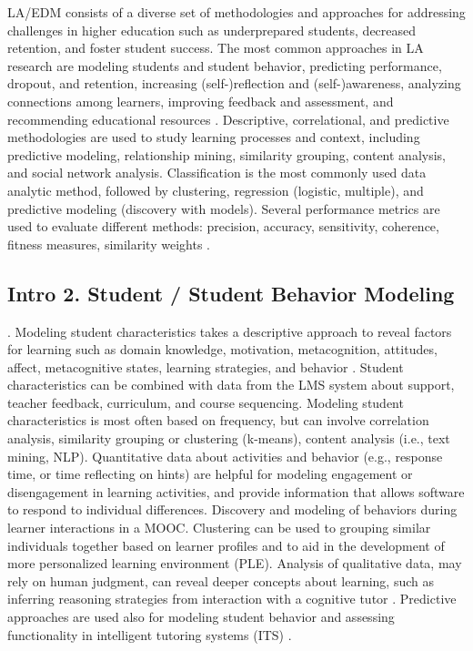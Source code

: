 \documentclass[sigconf]{acmart}
\begin{document}

LA/EDM consists of a diverse set of methodologies and approaches for 
addressing challenges in higher education such as underprepared students, 
decreased retention, and foster student success. The most common approaches in 
LA research are modeling students and student behavior, predicting performance, 
dropout, and retention, increasing (self-)reflection and (self-)awareness, 
analyzing connections among learners, improving feedback and assessment, and 
recommending educational resources \cite{lang17, lester19, papamitsiou14}. 
Descriptive, correlational, and predictive methodologies are used to study 
learning processes and context, including predictive modeling, relationship 
mining, similarity grouping, content analysis, and social network analysis. 
Classification is the most commonly used data analytic method, followed by 
clustering, regression (logistic, multiple), and predictive modeling (discovery
with models). Several performance metrics are used to evaluate different 
methods: precision, accuracy, sensitivity, coherence, fitness measures, 
similarity weights \cite{bakerYucef09}. 


\subsection{Intro 2. Student / Student Behavior Modeling}.
Modeling student characteristics takes a descriptive approach to reveal factors 
for learning such as domain knowledge, 
motivation, metacognition, attitudes, affect, metacognitive states, learning 
strategies, and behavior \cite{Papamitsiou14}. Student characteristics can be 
combined with data from the LMS system about support, teacher feedback, 
curriculum, and course sequencing. Modeling student characteristics is most 
often based on frequency, but can involve correlation analysis, similarity 
grouping or clustering (k-means), content analysis (i.e., text mining, NLP). 
Quantitative data about activities and behavior (e.g., response time, or 
time reflecting on hints) are helpful for modeling engagement or disengagement 
in learning activities, and provide information that allows software to respond 
to individual differences. Discovery and modeling of behaviors during learner 
interactions in a MOOC.  Clustering can be used to grouping similar individuals 
together based on learner profiles and to aid in the development of more 
personalized learning environment (PLE)\cite{Vellido10}. Analysis of qualitative 
data, may rely on human judgment, can reveal deeper concepts about learning, 
such as inferring reasoning strategies from interaction with a cognitive tutor 
\cite{Fournier11}. Predictive approaches are used also for modeling student 
behavior and assessing functionality in intelligent tutoring systems (ITS)
. 
\end{document}
